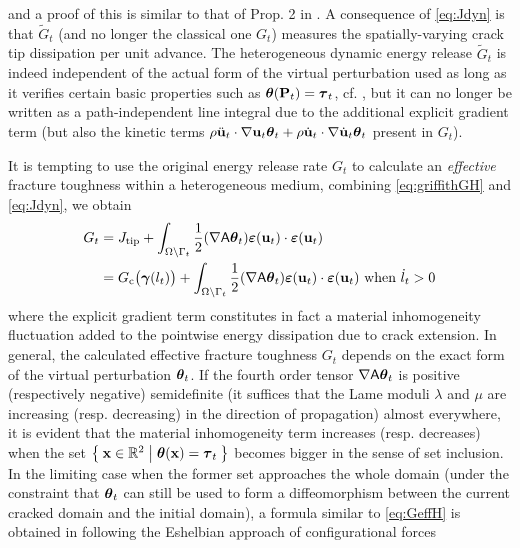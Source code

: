 and a proof of this is similar to that of Prop. 2 in \cite{LiMarigo:2015}. A consequence of \eqref{eq:Jdyn} is that $\widetilde{G}_t$ (and no longer the classical one $G_t$) measures the spatially-varying crack tip dissipation per unit advance. The heterogeneous dynamic energy release $\widetilde{G}_t$ is indeed independent of the actual form of the virtual perturbation used as long as it verifies certain basic properties such as $\vtheta(\vec{P}_t)=\vtau_t$, cf. \cite{LiMarigo:2015}, but it can no longer be written as a path-independent line integral due to the additional explicit gradient term (but also the kinetic terms $\rho\ddot{\vec{u}}_t\cdot\nabla\vec{u}_t\vtheta_t+\rho\dot{\vec{u}}_t\cdot\nabla\dot{\vec{u}}_t\vtheta_t$ present in $G_t$).

It is tempting to use the original energy release rate $G_t$ to calculate an \emph{effective} fracture toughness within a heterogeneous medium, combining \eqref{eq:griffithGH} and \eqref{eq:Jdyn}, we obtain
\begin{equation} \label{eq:GeffH}
\begin{aligned}
G_t &= J_\mathrm{tip}+\int_\domaint\frac{1}{2}(\nabla\tens{A}\vtheta_t)\eps(\vec{u}_t)\cdot\eps(\vec{u}_t) \\
&= \gc\bigl(\vec{\gamma}(l_t)\bigr)+\int_\domaint\frac{1}{2}(\nabla\tens{A}\vtheta_t)\eps(\vec{u}_t)\cdot\eps(\vec{u}_t)\text{ when $\dot{l}_t>0$}
\end{aligned}
\end{equation}
where the explicit gradient term constitutes in fact a material inhomogeneity fluctuation added to the pointwise energy dissipation due to crack extension. In general, the calculated effective fracture toughness $G_t$ depends on the exact form of the virtual perturbation $\vtheta_t$. If the fourth order tensor $\nabla\tens{A}\vtheta_t$ is positive (respectively negative) semidefinite (it suffices that the Lame moduli $\lambda$ and $\mu$ are increasing (resp. decreasing) in the direction of propagation) almost everywhere, it is evident that the material inhomogeneity term increases (resp. decreases) when the set $\Set{\vec{x}\in\mathbb{R}^2|\vtheta(\vec{x})=\vtau_t}$ becomes bigger in the sense of set inclusion. In the limiting case when the former set approaches the whole domain (under the constraint that $\vtheta_t$ can still be used to form a diffeomorphism between the current cracked domain and the initial domain), a formula similar to \eqref{eq:GeffH} is obtained in \cite{SimhaFischerKolednikChen:2003} following the Eshelbian approach of configurational forces
